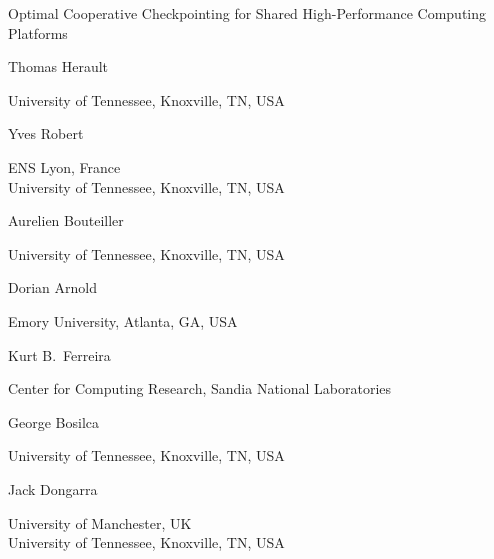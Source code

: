 \documentclass[two]{article}
\newcommand{\jtitle}{Optimal Cooperative Checkpointing for Shared High-Performance Computing Platforms}
\begin{document}
\thispagestyle{empty}
\copyrightheader


\begin{center}
\jtitle

\vspace{20pt}

Thomas Herault

\vspace{2pt}
University of Tennessee, Knoxville, TN, USA

\vspace{10pt}
%
\vspace{10pt}
Yves Robert\

\vspace{2pt}
ENS Lyon,  France\\
University of Tennessee, Knoxville, TN, USA


\vspace{10pt}

Aurelien Bouteiller

\vspace{2pt}
University of Tennessee, Knoxville, TN, USA


\vspace{10pt}
Dorian Arnold

\vspace{2pt}
Emory University, Atlanta, GA, USA

\vspace{10pt}
Kurt B.~Ferreira

\vspace{2pt}
Center for Computing Research, Sandia National
Laboratories

\vspace{10pt}
George Bosilca

\vspace{2pt}
University of Tennessee, Knoxville, TN, USA

%
\vspace{10pt}
Jack Dongarra

\vspace{2pt}
University of Manchester, UK\\
University of Tennessee, Knoxville, TN, USA

\vspace{20pt}

\end{center}
\end{document}
